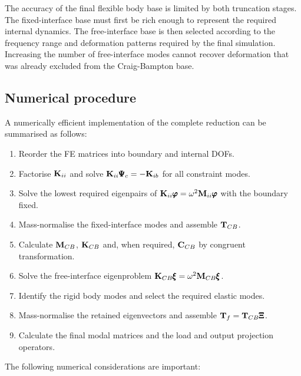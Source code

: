 The accuracy of the final flexible body base is limited by both truncation stages.
The fixed-interface base must first be rich enough to represent the required
internal dynamics. The free-interface base is then selected according to the
frequency range and deformation patterns required by the final simulation.
Increasing the number of free-interface modes cannot recover deformation that was
already excluded from the Craig-Bampton base.

\subsection{Numerical procedure}

A numerically efficient implementation of the complete reduction can be summarised
as follows:

\begin{enumerate}
    \item Reorder the FE matrices into boundary and internal DOFs.
    \item Factorise $ \mathbf{K}_{ii} $ and solve
          $ \mathbf{K}_{ii}\pmb{\Psi}_c = -\mathbf{K}_{ib} $ for all constraint modes.
    \item Solve the lowest required eigenpairs of
          $ \mathbf{K}_{ii}\pmb{\varphi} = \omega^2\mathbf{M}_{ii}\pmb{\varphi} $
          with the boundary fixed.
    \item Mass-normalise the fixed-interface modes and assemble $ \mathbf{T}_{CB} $.
    \item Calculate $ \mathbf{M}_{CB} $, $ \mathbf{K}_{CB} $ and, when required,
          $ \mathbf{C}_{CB} $ by congruent transformation.
    \item Solve the free-interface eigenproblem
          $ \mathbf{K}_{CB}\pmb{\xi} = \omega^2\mathbf{M}_{CB}\pmb{\xi} $.
    \item Identify the rigid body modes and select the required elastic modes.
    \item Mass-normalise the retained eigenvectors and assemble
          $ \mathbf{T}_f = \mathbf{T}_{CB}\pmb{\Xi} $.
    \item Calculate the final modal matrices and the load and output projection
          operators.
\end{enumerate}

The following numerical considerations are important:


